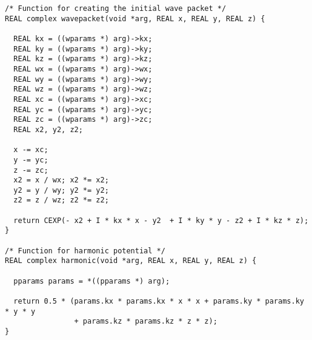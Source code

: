 \documentclass[12pt,letterpaper]{report}
\begin{document}
\begin{verbatim}
/* Function for creating the initial wave packet */
REAL complex wavepacket(void *arg, REAL x, REAL y, REAL z) {

  REAL kx = ((wparams *) arg)->kx;
  REAL ky = ((wparams *) arg)->ky;
  REAL kz = ((wparams *) arg)->kz;
  REAL wx = ((wparams *) arg)->wx;
  REAL wy = ((wparams *) arg)->wy;
  REAL wz = ((wparams *) arg)->wz;
  REAL xc = ((wparams *) arg)->xc;
  REAL yc = ((wparams *) arg)->yc;
  REAL zc = ((wparams *) arg)->zc;
  REAL x2, y2, z2;

  x -= xc;
  y -= yc;
  z -= zc;
  x2 = x / wx; x2 *= x2;
  y2 = y / wy; y2 *= y2;
  z2 = z / wz; z2 *= z2;

  return CEXP(- x2 + I * kx * x - y2  + I * ky * y - z2 + I * kz * z);
}

/* Function for harmonic potential */
REAL complex harmonic(void *arg, REAL x, REAL y, REAL z) {

  pparams params = *((pparams *) arg);

  return 0.5 * (params.kx * params.kx * x * x + params.ky * params.ky * y * y 
                + params.kz * params.kz * z * z);
}
\end{verbatim}
\end{document}
